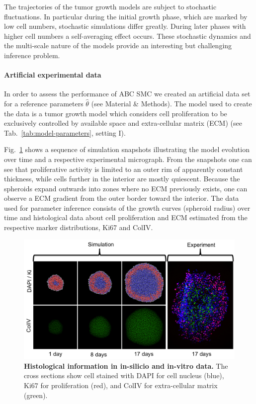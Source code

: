 \documentclass[10pt,letterpaper]{article}
\begin{document}
The trajectories of the tumor growth models are subject to stochastic fluctuations. In particular during the initial growth phase, which are marked by low cell numbers, stochastic simulations differ greatly. During later phases with higher cell numbers a self-averaging effect occurs. These stochastic dynamics and the multi-scale nature of the models provide an interesting but challenging inference problem.

\paragraph{Artificial experimental data}

In order to assess the performance of ABC SMC we created an artificial data set for a reference parameters $\hat{\theta}$ (see Material \& Methods). The model used to create the data is a tumor growth model which considers cell proliferation to be exclusively controlled by available space and extra-cellular matrix (ECM) (see Tab.~\ref{tab:model-parameters}, setting I). 

Fig.~\ref{fig2} shows a sequence of simulation snapshots illustrating the model evolution over time and a respective experimental micrograph.  From the snapshots one can see that proliferative activity is limited to an outer rim of apparently constant thickness, while cells further in the interior are mostly quiescent. Because the spheroids expand outwards into zones where no ECM previously exists, one can observe a ECM gradient from the outer border toward the interior. The data used for parameter inference consists of the growth curves (spheroid radius) over time and histological data about cell proliferation and ECM estimated from the respective marker distributions, Ki67 and ColIV.

\begin{figure}[!h]
\includegraphics[width=\textwidth]{Figures/SimulationSnapshots}
\caption{{\bf Histological information in in-silicio and in-vitro data.}
The cross sections show cell stained with DAPI for cell nucleus (blue), Ki67 for proliferation (red), and ColIV  for extra-cellular matrix (green).}
\label{fig2}
\end{figure}
\end{document}
